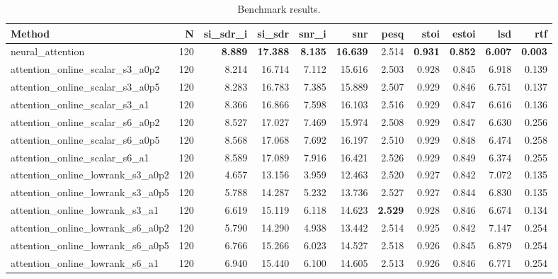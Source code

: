 \begin{table}[t]
\centering
\caption{Benchmark results.}
\label{tab:bench}
\begin{tabular}{lrrrrrrrrrr}
\toprule
Method & N & si\_sdr\_i & si\_sdr & snr\_i & snr & pesq & stoi & estoi & lsd & rtf \\
\midrule
neural_attention & 120 & \textbf{8.889} & \textbf{17.388} & \textbf{8.135} & \textbf{16.639} & 2.514 & \textbf{0.931} & \textbf{0.852} & \textbf{6.007} & \textbf{0.003} \\
attention_online_scalar_s3_a0p2 & 120 & 8.214 & 16.714 & 7.112 & 15.616 & 2.503 & 0.928 & 0.845 & 6.918 & 0.139 \\
attention_online_scalar_s3_a0p5 & 120 & 8.283 & 16.783 & 7.385 & 15.889 & 2.507 & 0.929 & 0.846 & 6.751 & 0.137 \\
attention_online_scalar_s3_a1 & 120 & 8.366 & 16.866 & 7.598 & 16.103 & 2.516 & 0.929 & 0.847 & 6.616 & 0.136 \\
attention_online_scalar_s6_a0p2 & 120 & 8.527 & 17.027 & 7.469 & 15.974 & 2.508 & 0.929 & 0.847 & 6.630 & 0.256 \\
attention_online_scalar_s6_a0p5 & 120 & 8.568 & 17.068 & 7.692 & 16.197 & 2.510 & 0.929 & 0.848 & 6.474 & 0.258 \\
attention_online_scalar_s6_a1 & 120 & 8.589 & 17.089 & 7.916 & 16.421 & 2.526 & 0.929 & 0.849 & 6.374 & 0.255 \\
attention_online_lowrank_s3_a0p2 & 120 & 4.657 & 13.156 & 3.959 & 12.463 & 2.520 & 0.927 & 0.842 & 7.072 & 0.135 \\
attention_online_lowrank_s3_a0p5 & 120 & 5.788 & 14.287 & 5.232 & 13.736 & 2.527 & 0.927 & 0.844 & 6.830 & 0.135 \\
attention_online_lowrank_s3_a1 & 120 & 6.619 & 15.119 & 6.118 & 14.623 & \textbf{2.529} & 0.928 & 0.846 & 6.674 & 0.134 \\
attention_online_lowrank_s6_a0p2 & 120 & 5.790 & 14.290 & 4.938 & 13.442 & 2.514 & 0.925 & 0.842 & 7.147 & 0.254 \\
attention_online_lowrank_s6_a0p5 & 120 & 6.766 & 15.266 & 6.023 & 14.527 & 2.518 & 0.926 & 0.845 & 6.879 & 0.254 \\
attention_online_lowrank_s6_a1 & 120 & 6.940 & 15.440 & 6.100 & 14.605 & 2.513 & 0.926 & 0.846 & 6.771 & 0.254 \\
\bottomrule
\end{tabular}
\end{table}